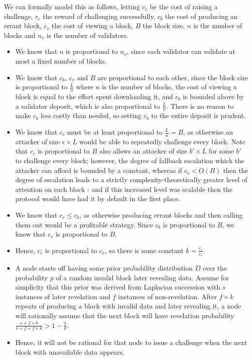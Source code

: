 \documentclass[11pt,a4paper]{report}
\theoremstyle{plain}
\theoremstyle{definition}
\theoremstyle{remark}
\begin{document}
We can formally model this as follows, letting $c_c$ be the cost of raising a challenge, $r_c$ the reward of challenging successfully, $c_b$ the cost of producing an errant block, $c_v$ the cost of viewing a block, $B$ the block size, $n$ is the number of blocks and $n_v$ is the number of validators. 

\begin{itemize}
\item
We know that $n$ is proportional to $n_v$, since each validator can validate at most a fixed number of blocks.
\item
We know that $c_b$, $c_v$ and $B$ are proportional to each other, since the block size is proportional to $\frac{L}{n}$ where $n$ is the number of blocks, the cost of viewing a block is equal to the effort spent downloading it, and $c_b$ is bounded above by a validator deposit, which is also proportional to $\frac{L}{n}$. There is no reason to make $c_b$ less costly than needed, so setting $c_b$ to the entire deposit is prudent.
\item
We know that $c_c$ must be at least proportional to $\frac{L}{n} = B$, as otherwise an attacker of size $\epsilon \times  L$ would be able to repeatedly challenge every block. Note that $c_c$ is proportional to $B$ also allows an attacker of size $b' \times  L$ for some $b'$ to challenge every block; however, the degree of fallback escalation which the attacker can afford is bounded by a constant, whereas if $c_c < O(B)$ then the degree of escalation leads to a strictly complexity-theoretically greater level of attention on each block - and if this increased level was scalable then the protocol would have had it by default in the first place.
\item
We know that $c_r \le c_b$, as otherwise producing errant blocks and then calling them out would be a profitable strategy. Since $c_b$ is proportional to $B$, we know that $c_r$ is proportional to $B$.
\item
Hence, $c_c$ is proportional to $c_r$, so there is some constant $k = \frac{c_c}{c_r}$.
\item
A node starts off having some prior probability distribution $D$ over the probability $p$ of a random invalid block later revealing data. Assume for simplicity that this prior was derived from Laplacian succession \citep{laplace_essai_1840} with $s$ instances of later revelation and $f$ instances of non-revelation. After $f \times  k$ repeats of producing a block with invalid data and later revealing it, a node will rationally assume that the next block will have revelation probability $\frac{s + f \times  k}{s + f + f \times  k} > 1 - \frac{1}{k}$.


\item
Hence, it will not be rational for that node to issue a challenge when the next block with unavailable data appears.
\end{itemize}
\end{document}
